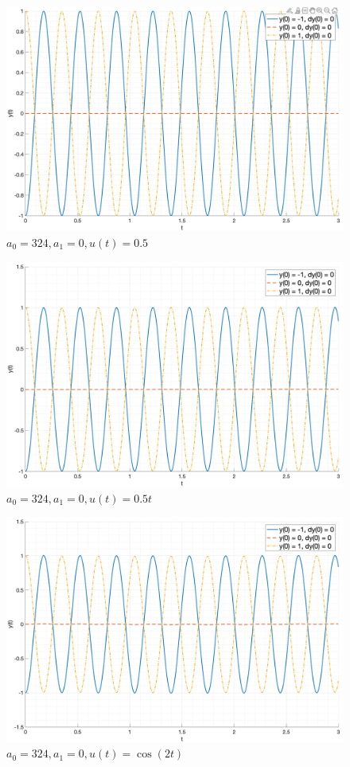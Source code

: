 \begin{figure}[ht!]
    \centering
    \includegraphics[width=\textwidth]{media/plots/case2_input1.png}
    \caption{$a_0 = 324, a_1 = 0, u(t) = 0.5$}
    \label{fig:case2_input1}
\end{figure}
\begin{figure}[ht!]
    \centering
    \includegraphics[width=\textwidth]{media/plots/case2_input2.png}
    \caption{$a_0 = 324, a_1 = 0, u(t) = 0.5t$}
    \label{fig:case2_input2}
\end{figure}
\begin{figure}[ht!]
    \centering
    \includegraphics[width=\textwidth]{media/plots/case2_input3.png}
    \caption{$a_0 = 324, a_1 = 0, u(t) = \cos(2t)$}
    \label{fig:case2_input3}
\end{figure}


